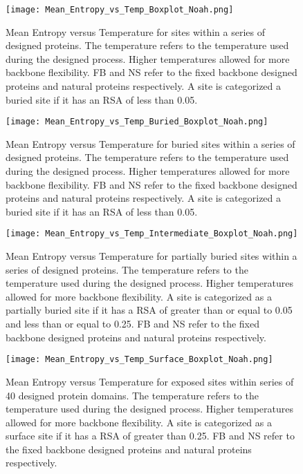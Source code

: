 \documentclass[12pt]{article}
\begin{document}
\begin{figure}[H]
\centerline{\texttt{[image: Mean\_Entropy\_vs\_Temp\_Boxplot\_Noah.png]}}
\caption{Mean Entropy versus Temperature for sites within a series of designed proteins. The temperature refers to the temperature used during the designed process. Higher temperatures allowed for more backbone flexibility. FB and NS refer to the fixed backbone designed proteins and natural proteins respectively.  A site is categorized a buried site if it has an RSA of less than 0.05.}
\label{Mean_Entropy_Noah}
\end{figure}

\begin{figure}[H]
\centerline{\texttt{[image: Mean\_Entropy\_vs\_Temp\_Buried\_Boxplot\_Noah.png]}}
\caption{Mean Entropy versus Temperature for buried sites within a series of designed proteins. The temperature refers to the temperature used during the designed process. Higher temperatures allowed for more backbone flexibility. FB and NS refer to the fixed backbone designed proteins and natural proteins respectively.  A site is categorized a buried site if it has an RSA of less than 0.05.}
\label{Buried_Entropy_Noah}
\end{figure}

\begin{figure}[H]
\centerline{\texttt{[image: Mean\_Entropy\_vs\_Temp\_Intermediate\_Boxplot\_Noah.png]}}
\caption{Mean Entropy versus Temperature for partially buried sites within a series of designed proteins. The temperature refers to the temperature used during the designed process. Higher temperatures allowed for more backbone flexibility. A site is categorized as a partially buried site if it has a RSA of greater than or equal to 0.05 and less than or equal to 0.25. FB and NS refer to the fixed backbone designed proteins and natural proteins respectively.}
\label{Inter_Entropy_Noah}
\end{figure}

\begin{figure}[H]
\centerline{\texttt{[image: Mean\_Entropy\_vs\_Temp\_Surface\_Boxplot\_Noah.png]}}
\caption{Mean Entropy versus Temperature for exposed sites within series of 40 designed protein domains. The temperature refers to the temperature used during the designed process. Higher temperatures allowed for more backbone flexibility. A site is categorized as a surface site if it has a RSA of greater than 0.25. FB and NS refer to the fixed backbone designed proteins and natural proteins respectively.}
\label{Surface_Entropy_Noah}
\end{figure}
\end{document}

